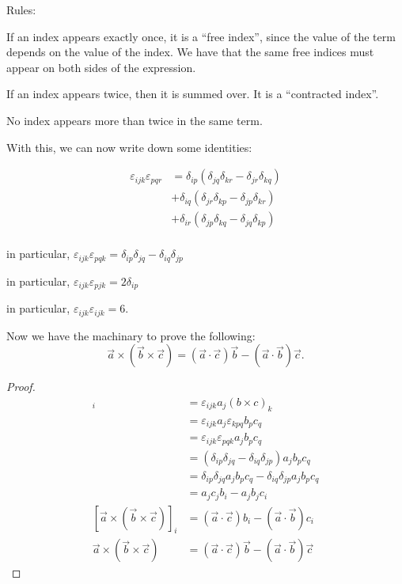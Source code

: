 \documentclass[12pt]{article}
\begin{document}
Rules:
\begin{compactitem}
\item If an index appears exactly once, it is a ``free index'',
    since the value of the term depends on the value of the index.
    We have that the same free indices must appear on 
    both sides of the expression.
\item If an index appears twice, then it is summed over. 
    It is a ``contracted index''.
\item No index appears more than twice in the same term.
\end{compactitem}

With this, we can now write down some identities:
\begin{compactenum}[(i)]
\item \begin{align*}
        \varepsilon _{ijk}\varepsilon _{pqr} &= \delta_{ip}(\delta_{jq}\delta_{kr} - \delta_{jr}\delta_{kq})\\
                                             &+ \delta_{iq}(\delta_{jr}\delta_{kp} - \delta_{jp}\delta_{kr})\\
                                             &+ \delta_{ir}(\delta_{jp}\delta_{kq} - \delta_{jq}\delta_{kp})\\
    \end{align*}
\item in particular, $\varepsilon_{ijk}\varepsilon_{pqk} = \delta_{ip}\delta_{jq} - \delta _{iq}\delta _{jp}$
\item in particular, $\varepsilon _{ijk}\varepsilon _{pjk} = 2\delta_{ip}$
\item in particular, $\varepsilon_{ijk}\varepsilon_{ijk} = 6$.
\end{compactenum}

Now we have the machinary to prove the following:
\[
\vec{a} \times (\vec{b} \times \vec{c}) = (\vec{a} \cdot \vec{c})\vec{b} - (\vec{a} \cdot \vec{b})\vec{c}.
\]
\begin{proof}
    \begin{align*}
        [\vec{a} \times (\vec{b}\times\vec{c})]_i 
        &= \varepsilon _{ijk}a_j(b \times c)_k\\
        &= \varepsilon _{ijk} a_j \varepsilon _{kpq} b_p c_q\\
        &= \varepsilon _{ijk}\varepsilon _{pqk} a_j b_p c_q\\
        &= (\delta _{ip}\delta _{jq} - \delta _{iq}\delta _{jp}) a_j b_p c_q\\
        &= \delta _{ip}\delta _{jq} a_j b_p c_q - \delta _{iq}\delta _{jp} a_j b_p c_q\\
        &= a_j c_j b_i - a_j b_j c_i\\
        [\vec{a} \times (\vec{b}\times\vec{c})]_i 
        &= (\vec{a}\cdot\vec{c})b_i - (\vec{a}\cdot\vec{b})c_i\\
        \vec{a} \times (\vec{b}\times\vec{c})
        &= (\vec{a}\cdot\vec{c})\vec{b} - (\vec{a}\cdot\vec{b})\vec{c}
    \end{align*}
\end{proof}
\end{document}

